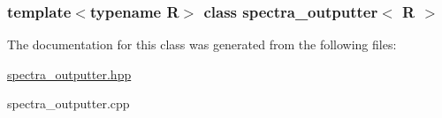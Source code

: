 \subsubsection*{template$<$typename R$>$ class spectra\_\-outputter$<$ R $>$}



The documentation for this class was generated from the following files:\begin{DoxyCompactItemize}
\item 
\hyperlink{spectra__outputter_8hpp}{spectra\_\-outputter.hpp}\item 
spectra\_\-outputter.cpp\end{DoxyCompactItemize}
